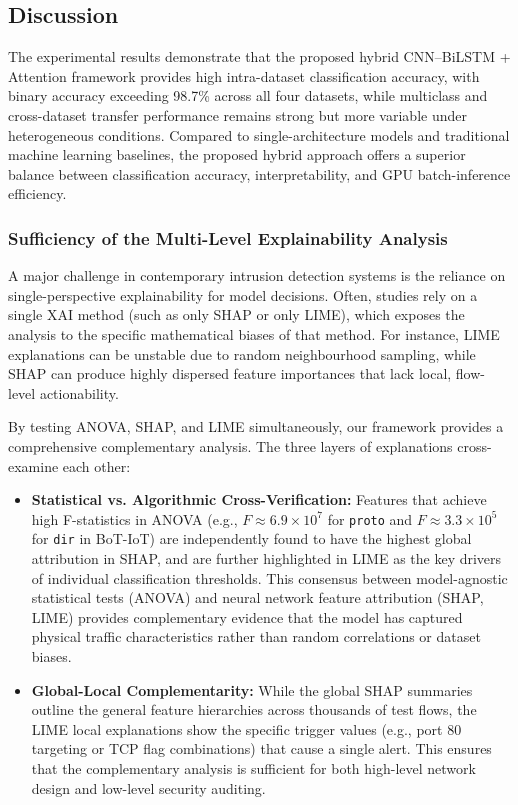 \documentclass[a4paper,fleqn]{cas-sc}
\begin{document}
\subsection{Discussion}

The experimental results demonstrate that the proposed hybrid CNN--BiLSTM + Attention framework provides high intra-dataset classification accuracy, with binary accuracy exceeding 98.7\% across all four datasets, while multiclass and cross-dataset transfer performance remains strong but more variable under heterogeneous conditions. Compared to single-architecture models and traditional machine learning baselines, the proposed hybrid approach offers a superior balance between classification accuracy, interpretability, and GPU batch-inference efficiency.

\subsubsection{Sufficiency of the Multi-Level Explainability Analysis}
A major challenge in contemporary intrusion detection systems is the reliance on single-perspective explainability for model decisions. Often, studies rely on a single XAI method (such as only SHAP or only LIME), which exposes the analysis to the specific mathematical biases of that method. For instance, LIME explanations can be unstable due to random neighbourhood sampling, while SHAP can produce highly dispersed feature importances that lack local, flow-level actionability.

By testing ANOVA, SHAP, and LIME simultaneously, our framework provides a comprehensive complementary analysis. The three layers of explanations cross-examine each other:
\begin{itemize}
    \item \textbf{Statistical vs. Algorithmic Cross-Verification:} Features that achieve high F-statistics in ANOVA (e.g., $F \approx 6.9 \times 10^7$ for \texttt{proto} and $F \approx 3.3 \times 10^5$ for \texttt{dir} in BoT-IoT) are independently found to have the highest global attribution in SHAP, and are further highlighted in LIME as the key drivers of individual classification thresholds. This consensus between model-agnostic statistical tests (ANOVA) and neural network feature attribution (SHAP, LIME) provides complementary evidence that the model has captured physical traffic characteristics rather than random correlations or dataset biases.
    \item \textbf{Global-Local Complementarity:} While the global SHAP summaries outline the general feature hierarchies across thousands of test flows, the LIME local explanations show the specific trigger values (e.g., port 80 targeting or TCP flag combinations) that cause a single alert. This ensures that the complementary analysis is sufficient for both high-level network design and low-level security auditing.
\end{itemize}
\end{document}
